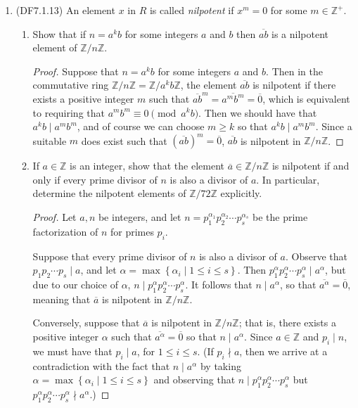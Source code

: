 \documentclass[11pt]{article}
\newcommand{\cbr}[1]{\left\{#1\right\}}
\begin{document}
\begin{enumerate}
    \item (DF7.1.13) An element $x$ in $R$ is called \textit{nilpotent} if $x^m = 0 $ for some $m\in \mathbb{Z}^+$. \begin{enumerate}[label=\textbf{(\alph*)}]
        \item Show that if $n = a^kb$ for some integers $a$ and $b$ then $\overline{ab}$ is a nilpotent element of $\mathbb{Z}/n\mathbb{Z}$.
        \begin{proof}
            Suppose that $n = a^kb$ for some integers $a$ and $b$. Then in the commutative ring $\mathbb{Z}/n\mathbb{Z} = \mathbb{Z}/a^kb\mathbb{Z}$, the element $\overline{ab}$ is nilpotent if there exists a positive integer $m$ such that $\overline{ab}^m = \overline{a^mb^m} = \overline{0}$, which is equivalent to requiring that $a^mb^m\equiv 0 \pmod{a^kb}$. Then we should have that $a^kb\mid a^mb^m$, and of course we can choose $m\geq k$ so that $a^kb\mid a^mb^m$. Since a suitable $m$ does exist such that $(\overline{ab})^m = \overline{0}$, $\overline{ab}$ is nilpotent in $\mathbb{Z}/n\mathbb{Z}$.
        \end{proof}
        \item If $a\in\mathbb{Z}$ is an integer, show that the element $\overline{a}\in\mathbb{Z}/n\mathbb{Z}$ is nilpotent if and only if every prime divisor of $n$ is also a divisor of $a$. In particular, determine the nilpotent elements of $\mathbb{Z}/72\mathbb{Z}$ explicitly.
        \begin{proof}
            Let $a,n$ be integers, and let $n = p_1^{\alpha_1}p_2^{\alpha_2}\cdots p_s^{\alpha_s}$ be the prime factorization of $n$ for primes $p_i$.

            Suppose that every prime divisor of $n$ is also a divisor of $a$. Observe that $p_1p_2\cdots p_s\mid a$, and let $\alpha = \max\cbr{\alpha_i\mid 1\leq i\leq s}$. Then $ p_1^{\alpha}p_2^{\alpha}\cdots p_s^{\alpha}\mid a^\alpha$, but due to our choice of $\alpha$, $n\mid p_1^{\alpha}p_2^{\alpha}\cdots p_s^{\alpha}$. It follows that $n\mid a^\alpha$, so that $\overline{a^\alpha} = \overline{0}$, meaning that $\overline{a}$ is nilpotent in $\mathbb{Z}/n\mathbb{Z}$.

            Conversely, suppose that $\overline{a}$ is nilpotent in $\mathbb{Z}/n\mathbb{Z}$; that is, there exists a positive integer $\alpha$ such that $\overline{a^\alpha} = \overline{0}$ so that $n\mid a^\alpha$. Since $a\in\mathbb{Z}$ and $p_i\mid n$, we must have that $p_i\mid a$, for $1\leq i \leq s$. (If $p_i\nmid a$, then we arrive at a contradiction with the fact that $n\mid a^\alpha$ by taking $\alpha = \max\cbr{\alpha_i\mid 1\leq i\leq s}$ and observing that $n\mid p_1^{\alpha}p_2^{\alpha}\cdots p_s^{\alpha}$ but $p_1^{\alpha}p_2^{\alpha}\cdots p_s^{\alpha} \nmid a^\alpha$.) 


\end{proof}
\end{enumerate}
\end{enumerate}
\end{document}
